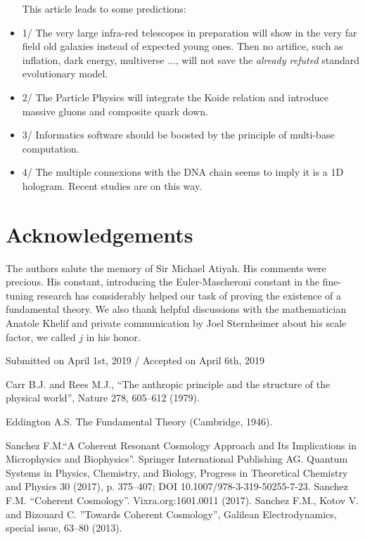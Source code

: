 \documentclass[twoside,draft]{article}
\begin{document}
\begin{sloppypar}
\begin{itemize}
      This article leads to some predictions:
\item 1/  The very large infra-red telescopes in preparation will show in the very far field old galaxies instead of expected young ones. Then no artifice, such as inflation, dark energy, multiverse ..., will not save the \textit{already refuted} standard evolutionary model.
\item 2/ The Particle Physics will integrate the Koide relation and introduce massive gluons and composite quark down.
\item 3/ Informatics software should  be boosted by the principle of multi-base computation.
\item 4/ The multiple connexions with the DNA chain seems to imply it is a 1D hologram. Recent studies \cite{Widom} are on this way. 
\end{itemize}


\section*{Acknowledgements}
The authors salute the memory of Sir Michael Atiyah. His comments were precious. His constant, introducing the Euler-Mascheroni constant in the fine-tuning research has considerably helped our task
of proving the existence of a fundamental theory. We also thank helpful discussions with the 
mathematician Anatole Khelif and private communication by Joel Sternheimer about his scale factor, 
we called $j$ in his honor.
%
\begin{flushright}\footnotesize
Submitted on April 1st, 2019 / Accepted on April 6th, 2019
\end{flushright}


\begin{thebibliography}{99}\footnotesize

 Carr B.J. and Rees M.J., ``The anthropic principle and the
structure of the physical world'', Nature 278, 605--612 (1979).

 Eddington A.S. The Fundamental Theory (Cambridge, 1946).

 Sanchez F.M.``A Coherent Resonant Cosmology Approach and Its Implications in Microphysics and Biophysics''. Springer International Publishing AG. Quantum Systems in Physics, Chemistry, and Biology, Progress in Theoretical Chemistry and Physics 30 (2017), p. 375--407; DOI 10.1007/978-3-319-50255-7-23.  Sanchez F.M. ``Coherent Cosmology''. Vixra.org:1601.0011 (2017). 
Sanchez F.M., Kotov V. and Bizouard C. ''Towards Coherent Cosmology'', Galilean Electrodynamics, special issue, 63--80 (2013).


\end{thebibliography}
\end{sloppypar}
\end{document}
